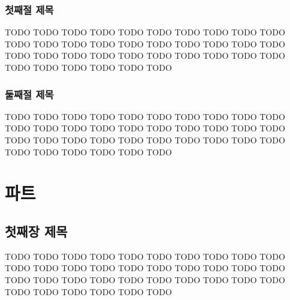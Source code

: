 \documentclass[b5paper,chapter,figtabcapt]{oblivoir}
\let\Oldlatex\LaTeX
\renewcommand{\LaTeX}{\textrm{\Oldlatex}}
\begin{document}
\section{첫째절 제목}
TODO TODO TODO TODO TODO TODO TODO TODO TODO TODO TODO TODO
TODO TODO TODO TODO TODO TODO TODO TODO TODO TODO TODO TODO
TODO TODO TODO TODO TODO TODO TODO TODO TODO TODO TODO TODO

\section{둘째절 제목}
TODO TODO TODO TODO TODO TODO TODO TODO TODO TODO TODO TODO
TODO TODO TODO TODO TODO TODO TODO TODO TODO TODO TODO TODO
TODO TODO TODO TODO TODO TODO TODO TODO TODO TODO TODO TODO


\part{파트}

\chapter{첫째장 제목}
TODO TODO TODO TODO TODO TODO TODO TODO TODO TODO TODO TODO
TODO TODO TODO TODO TODO TODO TODO TODO TODO TODO TODO TODO
TODO TODO TODO TODO TODO TODO TODO TODO TODO TODO TODO TODO


\printbibliography
\end{document}
